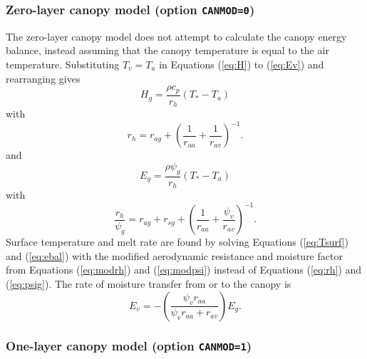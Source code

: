 \documentclass{article}
\begin{document}
\subsubsection{Zero-layer canopy model (option {\tt CANMOD=0})}

The zero-layer canopy model does not attempt to calculate the canopy energy balance, instead assuming that the canopy temperature is equal to the air temperature. Substituting $T_v = T_a$ in Equations (\ref{eq:H}) to (\ref{eq:Ev}) and rearranging gives
\begin{equation}
H_g = \frac{\rho c_p}{r_h}(T_* - T_a)
\end{equation}
with
\begin{equation}
r_h = r_{ag} + \left(\frac{1}{r_{aa}}+\frac{1}{r_{av}}\right)^{-1}.
\label{eq:modrh}
\end{equation}
and 
\begin{equation}
E_g = \frac{\rho\psi_g}{r_h}(T_* - T_a)
\end{equation}
with
\begin{equation}
\frac{r_h}{\psi_g} = r_{ag} + r_{sg} + \left(\frac{1}{r_{aa}}+\frac{\psi_v}{r_{av}}\right)^{-1}.
\label{eq:modpsi}
\end{equation}
Surface temperature and melt rate are found by solving Equations (\ref{eq:Tsurf}) and (\ref{eq:ebal}) with the modified aerodynamic resistance and moisture factor from Equations (\ref{eq:modrh}) and (\ref{eq:modpsi}) instead of Equations (\ref{eq:rh}) and (\ref{eq:psig}). The rate of moisture transfer from or to the canopy is 
\begin{equation}
E_v = -\left(\frac{\psi_v r_{aa}}{\psi_v r_{aa} + r_{av}}\right)E_g.
\end{equation}


\subsubsection{One-layer canopy model (option {\tt CANMOD=1})}
\end{document}
